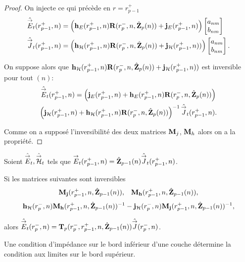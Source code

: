 \begin{proof}
      On injecte ce qui précède en \(r = r_{p-1}^+\)
      \begin{align*}
        \hat{{\overset{\rightarrow}{E}}}_t(r_{p-1}^+,n) &= 
        \left(\mathbf{h}_{E}(r_{p-1}^+,n)\mathbf{R}(r_{p}^-,n,\hat{\mathbf{Z}}_p(n)) + \mathbf{j}_{E}(r_{p-1}^+,n)\right)
        \begin{bmatrix}
          a_{nm} \\
          b_{nm}
        \end{bmatrix}
        \\
        \hat{{\overset{\rightarrow}{J}}}_t(r_{p-1}^+,n) &=
        \left(\mathbf{h}_{\mathcal{H}}(r_{p-1}^+,n)\mathbf{R}(r_{p}^-,n,\hat{\mathbf{Z}}_p(n)) + \mathbf{j}_{\mathcal{H}}(r_{p-1}^+,n))\right)
        \begin{bmatrix}
          a_{nm} \\
          b_{nm}
        \end{bmatrix}.
      \end{align*}

      On suppose alors que \(\mathbf{h}_{\mathcal{H}}(r_{p-1}^+,n)\mathbf{R}(r_{p}^-,n,\hat{\mathbf{Z}}_p(n)) + \mathbf{j}_{\mathcal{H}}(r_{p-1}^+,n))\) est inversible pour tout \((n)\):
      \begin{multline*}
        \hat{{\overset{\rightarrow}{E}}}_t(r_{p-1}^+,n) =
        \left(\mathbf{j}_{E}(r_{p-1}^+,n) + \mathbf{h}_{E}(r_{p-1}^+,n)\mathbf{R}(r_{p}^-,n,\hat{\mathbf{Z}}_p(n))\right) \\
        \left(\mathbf{j}_{\mathcal{H}}(r_{p-1}^+,n) + \mathbf{h}_{\mathcal{H}}(r_{p-1}^+,n)\mathbf{R}(r_{p}^-,n,\hat{\mathbf{Z}}_p(n))\right)^{-1}
        \hat{{\overset{\rightarrow}{J}}}_t(r_{p-1}^+,n).
      \end{multline*}

      Comme on a supposé l'inversibilité des deux matrices \(\mathbf{M}_j\), \(\mathbf{M}_h\) alors on a la propriété.
    \end{proof}

    \begin{prop}%
      \label{prop:sphere:relevement:impedance}

      Soient \(\hat{{\overset{\rightarrow}{E}}}_t,\hat{{\overset{\rightarrow}{\mathcal{H}}}}_t\) tels que \({\overset{\rightarrow}{E}}_t(r_{p-1}^+,n) = \hat{\mathbf{Z}}_{p-1}(n)\hat{{\overset{\rightarrow}{J}}}_t(r_{p-1}^+,n)\).

      Si les matrices suivantes sont inversibles
      \begin{align*}
        \mathbf{M}_{\mathbf{j}}(r_{p-1}^+,n,\hat{\mathbf{Z}}_{p-1}(n)), && \mathbf{M}_{\mathbf{h}}(r_{p-1}^+,n,\hat{\mathbf{Z}}_{p-1}(n)),
      \end{align*}
      \begin{align*}
        \mathbf{h}_{\mathcal{H}}(r_{p}^-,n)\mathbf{M}_{\mathbf{h}}(r_{p-1}^+,n,\hat{\mathbf{Z}}_{p-1}(n))^{-1} - \mathbf{j}_{\mathcal{H}}(r_{p}^-,n)\mathbf{M}_{\mathbf{j}}(r_{p-1}^+,n,\hat{\mathbf{Z}}_{p-1}(n))^{-1},
      \end{align*}

      alors \(\hat{{\overset{\rightarrow}{E}}}_t(r_{p}^-,n) = \mathbf{T}_p(r_p^-,r_{p-1}^+,n,\hat{\mathbf{Z}}_{p-1}(n))\hat{{\overset{\rightarrow}{J}}}(r_{p}^-,n)\).

      Une condition d'impédance sur le bord inférieur d'une couche détermine la condition aux limites sur le bord supérieur.
    \end{prop}

